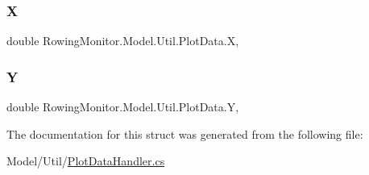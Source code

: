 \subsubsection{\texorpdfstring{X}{X}}
{\footnotesize\ttfamily double Rowing\+Monitor.\+Model.\+Util.\+Plot\+Data.\+X\hspace{0.3cm}{\ttfamily [get]}, {\ttfamily [set]}}

\mbox{\label{struct_rowing_monitor_1_1_model_1_1_util_1_1_plot_data_ad481a32ecc84d09b772a1e7737728e46}} 
\subsubsection{\texorpdfstring{Y}{Y}}
{\footnotesize\ttfamily double Rowing\+Monitor.\+Model.\+Util.\+Plot\+Data.\+Y\hspace{0.3cm}{\ttfamily [get]}, {\ttfamily [set]}}



The documentation for this struct was generated from the following file\+:\begin{DoxyCompactItemize}
\item 
Model/\+Util/\hyperlink{_plot_data_handler_8cs}{Plot\+Data\+Handler.\+cs}\end{DoxyCompactItemize}
